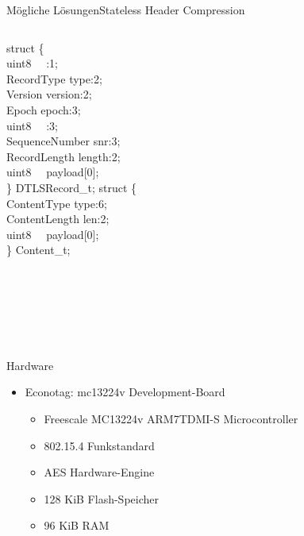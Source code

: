 \documentclass{beamer}
\begin{document}
\begin{frame}{Mögliche Lösungen}{Stateless Header Compression}
  \begin{columns}
      struct \{\\
      \qquad uint8 ~~:1;\\
      \qquad RecordType type:2;\\
      \qquad Version version:2;\\
      \qquad Epoch epoch:3;\\
      \qquad uint8 ~~:3;\\
      \qquad SequenceNumber snr:3;\\
      \qquad RecordLength length:2;\\
      \qquad uint8 ~~payload[0];\\
      \} DTLSRecord\_t;
      struct \{\\
      \qquad ContentType type:6;\\
      \qquad ContentLength len:2;\\
      \qquad uint8 ~~payload[0];\\
      \} Content\_t;\\
      ~\\
      ~\\
      ~\\
      ~\\
      ~
  \end{columns}
\end{frame}

\begin{frame}{Hardware}
  \begin{itemize}
    \item Econotag: mc13224v Development-Board
    \begin{itemize}
      \item Freescale MC13224v ARM7TDMI-S Microcontroller
      \item 802.15.4 Funkstandard
      \item AES Hardware-Engine
      \item 128 KiB Flash-Speicher
      \item 96 KiB RAM
    \end{itemize}
  \end{itemize}
\end{frame}
\end{document}
